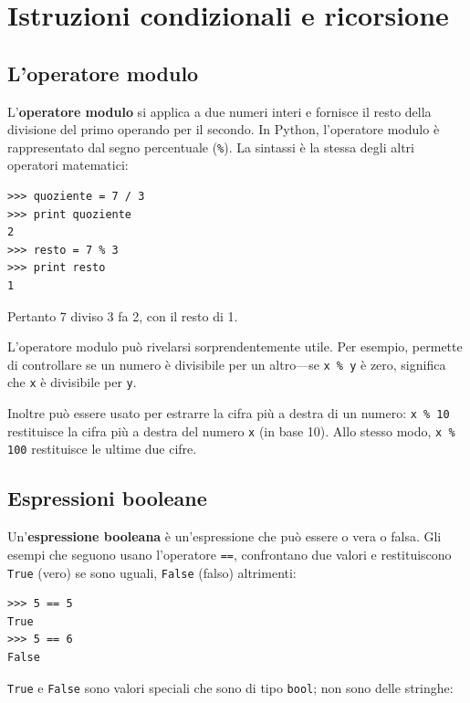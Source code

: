 \documentclass[10pt]{book}
\begin{document}
\chapter{Istruzioni condizionali e ricorsione}

\section{L'operatore modulo}

L'{\bf operatore modulo} si applica a due numeri interi e
   fornisce il resto della divisione del primo operando per il
   secondo. In Python, l'operatore modulo è rappresentato dal segno
   percentuale (\verb"%").  La sintassi è la stessa degli altri operatori
   matematici:

\begin{verbatim}
>>> quoziente = 7 / 3
>>> print quoziente
2
>>> resto = 7 % 3
>>> print resto
1
\end{verbatim}
%
Pertanto 7 diviso 3 fa 2, con il resto di 1.

L'operatore modulo può rivelarsi sorprendentemente utile. Per esempio, permette di controllare se un numero è divisibile per un altro---se
{\tt x \% y} è zero, significa che {\tt x} è divisibile per {\tt y}.

Inoltre può essere usato per estrarre la cifra più a destra di un numero: {\tt x \% 10} restituisce la cifra più a destra del numero {\tt x} (in base 10). Allo stesso modo, {\tt x \% 100} restituisce le ultime due cifre.


\section{Espressioni booleane}

Un'{\bf espressione booleana} è un'espressione che può essere o vera o falsa.  Gli esempi che seguono usano l'operatore {\tt ==}, confrontano due valori e restituiscono {\tt True} (vero) se sono uguali, {\tt False} (falso) altrimenti:

\begin{verbatim}
>>> 5 == 5
True
>>> 5 == 6
False
\end{verbatim}
%
{\tt True} e {\tt False} sono valori speciali che sono di tipo {\tt bool}; non sono delle stringhe:
\end{document}
